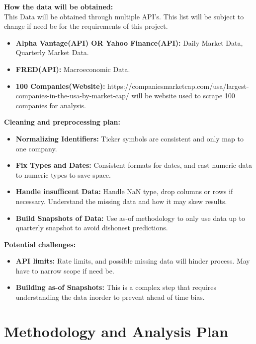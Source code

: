 \documentclass[12pt]{article}
\begin{document}
\noindent\textbf{How the data will be obtained:}\\
This Data will be obtained through multiple API's. This list will be subject to change if need be for the requirements of this project.
\begin{itemize}[leftmargin=2.25em]
  \item \textbf{Alpha Vantage(API) OR Yahoo Finance(API):} Daily Market Data, Quarterly Market Data.
  \item \textbf{FRED(API):} Macroeconomic Data.
  \item \textbf{100 Companies(Website):} https://companiesmarketcap.com/usa/largest-companies-in-the-usa-by-market-cap/ will be website used to scrape 100 companies for analysis.
\end{itemize}


\noindent\textbf{Cleaning and preprocessing plan:}
\begin{itemize}[leftmargin=2.25em]
  \item \textbf{Normalizing Identifiers:} Ticker symbols are consistent and only map to one company.
  \item \textbf{Fix Types and Dates:} Consistent formats for dates, and cast numeric data to numeric types to save space.
  \item \textbf{Handle insufficent Data:} Handle NaN type, drop columns or rows if necessary. Understand the missing data and how it may skew results.
  \item \textbf{Build Snapshots of Data:} Use as-of methodology to only use data up to quarterly snapshot to avoid dishonest predictions.
\end{itemize}


\noindent\textbf{Potential challenges:}
\begin{itemize}[leftmargin=2.25em]
   \item \textbf{API limits:} Rate limits, and possible missing data will hinder process. May have to narrow scope if need be.
   \item \textbf{Building as-of Snapshots:} This is a complex step that requires understanding the data inorder to prevent ahead of time bias.
\end{itemize}

\section*{Methodology and Analysis Plan}
\end{document}
